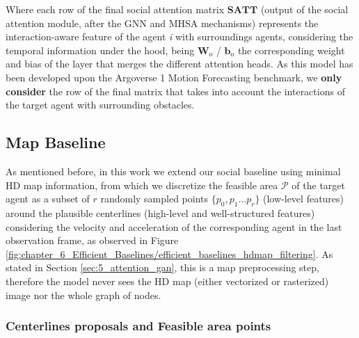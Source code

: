 Where each row of the final social attention matrix $\mathbf{SATT}$ (output of the social attention module, after the GNN and MHSA mechanisms) represents the interaction-aware feature of the agent \textit{i} with surroundings agents, considering the temporal information under the hood, being $\mathbf{W}_\mathrm{o}$ / $\mathbf{b}_\mathrm{o}$ the corresponding weight and bias of the layer that merges the different attention heads. As this model has been developed upon the Argoverse 1 Motion Forecasting benchmark, we \textbf{only consider} the row of the final matrix that takes into account the interactions of the target agent with surrounding obstacles.

\subsection{Map Baseline} 
\label{subsec:6_efficient_baselines_map_baseline}

As mentioned before, in this work we extend our social baseline using minimal HD map information, from which we discretize the feasible area $\mathcal{P}$ of the target agent as a subset of $r$ randomly sampled points $\{p_0 , p_1 ... p_r\}$ (low-level features) around the plausible centerlines (high-level and well-structured features) considering the velocity and acceleration of the corresponding agent in the last observation frame, as observed in Figure \ref{fig:chapter_6_Efficient_Baselines/efficient_baselines_hdmap_filtering}. As stated in Section \ref{sec:5_attention_gan}, this is a map preprocessing step, therefore the model never sees the HD map (either vectorized or rasterized) image nor the whole graph of nodes.

\subsubsection{Centerlines proposals and Feasible area points} 
\label{subsubsec:6_efficient_baselines_preprocessing_map}

